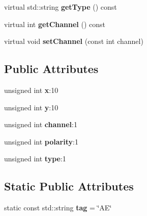 \begin{DoxyCompactItemize}
\item 
virtual std\+::string {\bfseries get\+Type} () const \hypertarget{classev_1_1AddressEvent_aef0dd1b9a82c2745ccaa0cfc9105df55}{}\label{classev_1_1AddressEvent_aef0dd1b9a82c2745ccaa0cfc9105df55}

\item 
virtual int {\bfseries get\+Channel} () const \hypertarget{classev_1_1AddressEvent_a88038634ab480b42ac1f056abe004b5d}{}\label{classev_1_1AddressEvent_a88038634ab480b42ac1f056abe004b5d}

\item 
virtual void {\bfseries set\+Channel} (const int channel)\hypertarget{classev_1_1AddressEvent_a50e188b1c5702cab67a2175b81c32767}{}\label{classev_1_1AddressEvent_a50e188b1c5702cab67a2175b81c32767}

\end{DoxyCompactItemize}
\subsection*{Public Attributes}
\begin{DoxyCompactItemize}
\item 
unsigned int {\bfseries x}\+:10\hypertarget{classev_1_1AddressEvent_ab6015dc7a789cb6ff7546c47d58829bf}{}\label{classev_1_1AddressEvent_ab6015dc7a789cb6ff7546c47d58829bf}

\item 
unsigned int {\bfseries y}\+:10\hypertarget{classev_1_1AddressEvent_a2e6918d9a0c935c2424e8096ed610c6f}{}\label{classev_1_1AddressEvent_a2e6918d9a0c935c2424e8096ed610c6f}

\item 
unsigned int {\bfseries channel}\+:1\hypertarget{classev_1_1AddressEvent_ab96b9ac3a42cf1d69859f1edbea9cc7f}{}\label{classev_1_1AddressEvent_ab96b9ac3a42cf1d69859f1edbea9cc7f}

\item 
unsigned int {\bfseries polarity}\+:1\hypertarget{classev_1_1AddressEvent_a79bbcea834183012aa39e9d4b2c594ed}{}\label{classev_1_1AddressEvent_a79bbcea834183012aa39e9d4b2c594ed}

\item 
unsigned int {\bfseries type}\+:1\hypertarget{classev_1_1AddressEvent_a06db4fdf4c9b93e259f2e4ef47e9da3a}{}\label{classev_1_1AddressEvent_a06db4fdf4c9b93e259f2e4ef47e9da3a}

\end{DoxyCompactItemize}
\subsection*{Static Public Attributes}
\begin{DoxyCompactItemize}
\item 
static const std\+::string {\bfseries tag} = \char`\"{}AE\char`\"{}\hypertarget{classev_1_1AddressEvent_a9a2d3e863964a1247ae4203a4ad2c646}{}\label{classev_1_1AddressEvent_a9a2d3e863964a1247ae4203a4ad2c646}

\end{DoxyCompactItemize}


